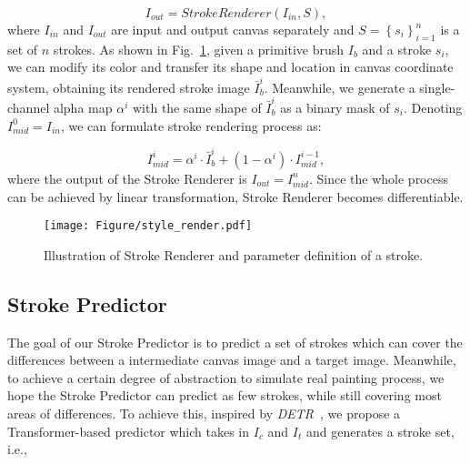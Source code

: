 \documentclass[10pt,twocolumn,letterpaper]{article}
\begin{document}
\begin{equation}
I_{out} = StrokeRenderer(I_{in}, S),
\end{equation}
where $I_{in}$ and $I_{out}$ are input and output canvas separately and $S = \left \{  s_i\right \}_{i=1}^n$ is a set of $n$ strokes.
As shown in Fig.~\ref{fig:style_render}, given a primitive brush $I_b$ and a stroke $s_i$, we can modify its color and transfer its shape and location in canvas coordinate system, obtaining its rendered stroke image $\bar{I}_b^i$. 
Meanwhile, we generate a single-channel alpha map $\alpha^i$ with the same shape of $\bar{I}_b^i$ as a binary mask of $s_i$.
Denoting $I^0_{mid} = I_{in}$, we can formulate stroke rendering process as:

\begin{equation}
I^i_{mid} = \alpha^i\cdot \bar{I}_b^i + (1 - \alpha^i)\cdot I_{mid}^{i-1},
\end{equation}
where the output of the Stroke Renderer is $I_{out} = I^n_{mid}$.
Since the whole process can be achieved by linear transformation, Stroke Renderer becomes differentiable.











\begin{figure}[t]
\begin{center}
\texttt{[image: Figure/style\_render.pdf]}
\end{center}
   \caption{Illustration of Stroke Renderer and parameter definition of a stroke.}
\label{fig:style_render}
\vspace{-0.4cm}
\end{figure}


\subsection{Stroke Predictor}
The goal of our Stroke Predictor is to predict a set of strokes which can cover the differences between a intermediate canvas image and a target image.
Meanwhile, to achieve a certain degree of abstraction to simulate real painting process, we hope the Stroke Predictor can predict as few strokes, while still covering most areas of differences. 
To achieve this, inspired by \textit{DETR}~\cite{carion2020endtoend}, we propose a Transformer-based predictor which takes in $I_c$ and $I_t$ and generates a stroke set, i.e.,
\end{document}
